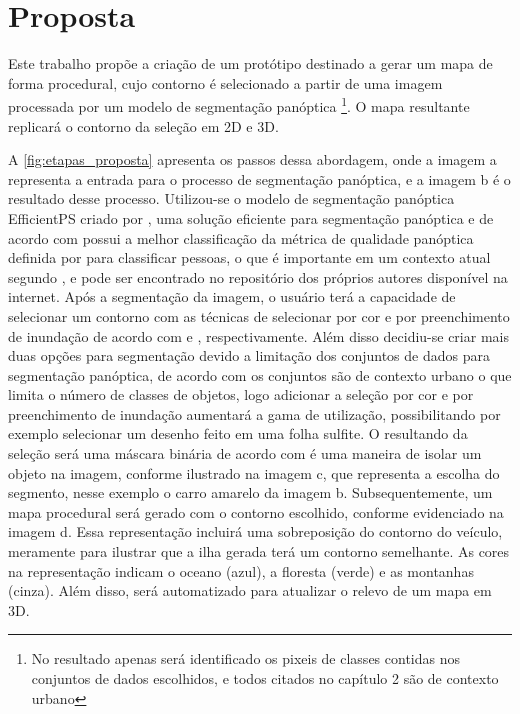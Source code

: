 \section{Proposta}

Este trabalho propõe a criação de um protótipo destinado a gerar um mapa de forma procedural, cujo contorno é selecionado a partir de uma imagem processada por um modelo de segmentação panóptica \footnote{No resultado apenas será identificado os pixeis de classes contidas nos conjuntos de dados escolhidos, e todos citados no capítulo 2 são de contexto urbano}. O mapa resultante replicará o contorno da seleção em 2D e 3D.

A \cref{fig:etapas_proposta} apresenta os passos dessa abordagem, onde a imagem a representa a entrada para o processo de segmentação panóptica, e a imagem b é o resultado desse processo. Utilizou-se o modelo de segmentação panóptica EfficientPS criado por , uma solução eficiente para segmentação panóptica e de acordo com  possui a melhor classificação da métrica de qualidade panóptica definida por  para classificar pessoas, o que é importante em um contexto atual segundo 
, e pode ser encontrado no repositório dos próprios autores  disponível na internet. Após a segmentação da imagem, o usuário terá a capacidade de selecionar um contorno com as técnicas de selecionar por cor e por preenchimento de inundação de acordo com  e , respectivamente. Além disso decidiu-se criar mais duas opções para segmentação devido a limitação dos conjuntos de dados para segmentação panóptica, de acordo com  os conjuntos são de contexto urbano o que limita o número de classes de objetos, logo adicionar a seleção por cor e por preenchimento de inundação aumentará a gama de utilização, possibilitando por exemplo selecionar um desenho feito em uma folha sulfite.
O resultando da seleção será uma máscara binária de acordo com  é uma maneira de isolar um objeto na imagem, conforme ilustrado na imagem c, que representa a escolha do segmento, nesse exemplo o carro amarelo da imagem b. Subsequentemente, um mapa procedural será gerado com o contorno escolhido, conforme evidenciado na imagem d. Essa representação incluirá uma sobreposição do contorno do veículo, meramente para ilustrar que a ilha gerada terá um contorno semelhante. As cores na representação indicam o oceano (azul), a floresta (verde) e as montanhas (cinza). Além disso, será automatizado para atualizar o relevo de um mapa em 3D.

